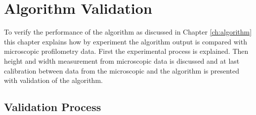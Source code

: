 
\chapter{Algorithm Validation}\label{ch:validation} 

To verify the performance of the algorithm as discussed in Chapter \ref{ch:algorithm} this chapter explains how by  experiment the algorithm output is compared with microscopic profilometry data. First the experimental process is explained. Then height and width measurement from microscopic data is discussed and at last calibration between data from the microscopic and the algorithm is presented with validation of the algorithm.

\section{Validation Process}

